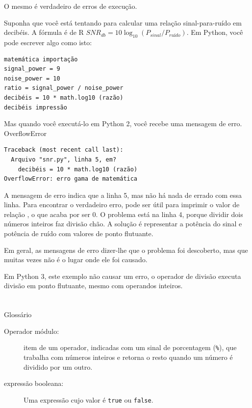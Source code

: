 \documentclass[10pt]{book}
\begin{document}
{{O mesmo é verdadeiro de erros de execução.  

Suponha que você está tentando
para calcular uma relação sinal-para-ruído em decibéis. A fórmula
é de R $ SNR_ {db} = 10 \log_ {10} (P_ {sinal} / P_ {ruído}) $. Em Python,
você pode escrever algo como isto:

\begin{verbatim}
matemática importação
signal_power = 9
noise_power = 10
ratio = signal_power / noise_power
decibéis = 10 * math.log10 (razão)
decibéis impressão
\end{verbatim}
%
Mas quando você executá-lo em Python 2, você recebe uma mensagem de erro.
\index{} OverflowError

\begin{verbatim}
Traceback (most recent call last):
  Arquivo "snr.py", linha 5, em?
    decibéis = 10 * math.log10 (razão)
OverflowError: erro gama de matemática
\end{verbatim}
%
A mensagem de erro indica que a linha 5, mas não há nada
de errado com essa linha. Para encontrar o verdadeiro erro, pode ser
útil para imprimir o valor de {relação \tt}, o que acaba por
ser 0. O problema está na linha 4, porque dividir dois números inteiros
faz divisão chão. A solução é representar a potência do sinal
e potência de ruído com valores de ponto flutuante.

Em geral, as mensagens de erro dizer-lhe que o problema foi descoberto, 
mas que muitas vezes não é o lugar onde ele foi causado.

Em Python 3, este exemplo não causar um erro, o operador de divisão
executa divisão em ponto flutuante, mesmo com operandos inteiros.


\section{} Glossário

\begin{description}

\item[Operador módulo:] item de um operador, indicadas com um sinal de porcentagem
({\tt \%}), que trabalha com números inteiros e retorna o resto quando um
número é dividido por um outro.

\item[expressão booleana:] Uma expressão cujo valor é 
{\tt true} ou {\tt false}.


\end{description}}}
\end{document}
